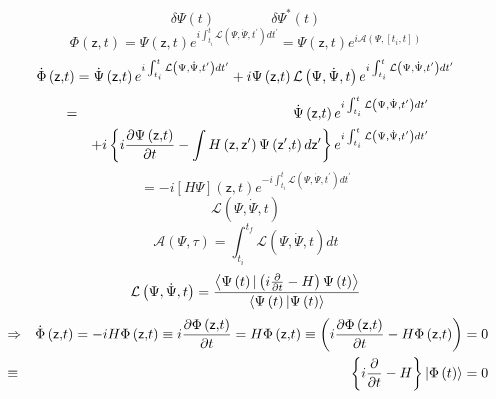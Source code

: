 \documentclass[aps,preprint]{revtex4}
\begin{document}
\begin{equation}
\delta \Psi \left( t\right) \qquad \qquad \delta \Psi ^{\ast }\left( t\right)
\end{equation}%
\begin{equation}
\Phi \left( \mathsf{z,}t\right) =\Psi \left( \mathsf{z,}t\right)
e^{i\int_{t_{i}}^{t}\mathcal{L}\left( \Psi ,\dot{\Psi},t^{\prime }\right)
dt^{\prime }}=\Psi \left( \mathsf{z,}t\right) e^{i\mathcal{A}\left( \Psi ,%
\left[ t_{i},t\right] \right) }
\end{equation}%
\begin{equation}
\dot{\Phi}\left( \mathsf{z,}t\right) =\dot{\Psi}\left( \mathsf{z,}t\right)
e^{i\int_{t_{i}}^{t}\mathcal{L}\left( \Psi ,\dot{\Psi},t^{\prime }\right)
dt^{\prime }}+i\Psi \left( \mathsf{z,}t\right) \mathcal{L}\left( \Psi ,\dot{%
\Psi},t\right) e^{i\int_{t_{i}}^{t}\mathcal{L}\left( \Psi ,\dot{\Psi}%
,t^{\prime }\right) dt^{\prime }}
\end{equation}%
\begin{eqnarray}
&=&\dot{\Psi}\left( \mathsf{z,}t\right) e^{i\int_{t_{i}}^{t}\mathcal{L}%
\left( \Psi ,\dot{\Psi},t^{\prime }\right) dt^{\prime }}  \notag \\
&&+i\left\{ i\frac{\partial \Psi \left( \mathsf{z,}t\right) }{\partial t}%
-\int H\left( \mathsf{z,z}^{\prime }\right) \Psi \left( \mathsf{z}^{\prime }%
\mathsf{,}t\right) d\mathsf{z}^{\prime }\right\} e^{i\int_{t_{i}}^{t}%
\mathcal{L}\left( \Psi ,\dot{\Psi},t^{\prime }\right) dt^{\prime }}  \notag
\end{eqnarray}%
\begin{equation}
=-i\left[ H\Psi \right] \left( \mathsf{z,}t\right) e^{-i\int_{t_{i}}^{t}%
\mathcal{L}\left( \Psi ,\dot{\Psi},t^{\prime }\right) dt^{\prime }}
\end{equation}%
\begin{equation}
\mathcal{L}\left( \Psi ,\dot{\Psi},t\right)
\end{equation}%
\begin{equation}
\mathcal{A}\left( \Psi ,\tau \right) =\int_{t_{i}}^{t_{f}}\mathcal{L}\left(
\Psi ,\dot{\Psi},t\right) dt
\end{equation}%
\begin{equation}
\mathcal{L}\left( \Psi ,\dot{\Psi},t\right) =\frac{\left\langle \Psi \left(
t\right) |\left( i\frac{\partial }{\partial t}-H\right) \Psi \left( t\right)
\right\rangle }{\left\langle \Psi \left( t\right) |\Psi \left( t\right)
\right\rangle }  \notag
\end{equation}%
\begin{eqnarray}
&\Rightarrow &\dot{\Phi}\left( \mathsf{z,}t\right) =-iH\Phi \left( \mathsf{z,%
}t\right) \equiv i\frac{\partial \Phi \left( \mathsf{z,}t\right) }{\partial t%
}=H\Phi \left( \mathsf{z,}t\right) \equiv \left( i\frac{\partial \Phi \left( 
\mathsf{z,}t\right) }{\partial t}-H\Phi \left( \mathsf{z,}t\right) \right) =0
\notag \\
&\equiv &\left\{ i\frac{\partial }{\partial t}-H\right\} \left| \Phi \left(
t\right) \right\rangle =0  \label{SE}
\end{eqnarray}%
\end{document}
